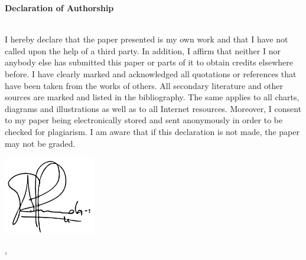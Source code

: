 \documentclass[
    12pt	%
    ]{article}
\begin{document}
  
\begin{titlepage}
\begin{center}

{\bf \Large \EMBACourse}
\vspace{1cm}

{\large \EMBALecturer}
\vspace{1cm}

{\EMBATestType}

\vspace{.5cm}
{\EMBAParticipant}

{\EMBAClass}
\vspace{.5cm}

\EMBADate

\vspace{1cm}

{\bf Declaration of Authorship}\\

\EMBACourse\\ 
\EMBATestType

\vspace{1cm}

I hereby declare that the paper presented is my own work and that I
have not called upon the help of a third party. In addition, I affirm
that neither I nor anybody else has submitted this paper or parts of
it to obtain credits elsewhere before. I have clearly marked and
acknowledged all quotations or references that have been taken from
the works of others. All secondary literature and other sources are
marked and listed in the bibliography. The same applies to all charts,
diagrams and illustrations as well as to all Internet
resources. Moreover, I consent to my paper being electronically stored
and sent anonymously in order to be checked for plagiarism.  I am
aware that if this declaration is not made, the paper may not be
graded.

\vspace{1cm}
\includegraphics[width=4cm] {img/signature.png}
\vspace{.1cm}

{\EMBAParticipant}

{\EMBACity, \EMBADate}

\end{center}

\end{titlepage}
\end{document}
